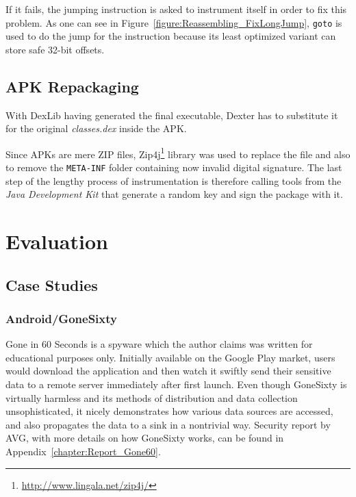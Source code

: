 \documentclass[12pt,twoside,notitlepage]{report}
\newcommand{\weblink}[1] {\footnote{\scriptsize\url{#1}}}
\begin{document}
If it fails, the jumping instruction is asked to instrument itself in order to fix this problem. As one can see in Figure~\ref{figure:Reassembling_FixLongJump}, \verb$goto$ is used to do the jump for the instruction because its least optimized variant can store safe 32-bit offsets.

\section{APK Repackaging}

With DexLib having generated the final executable, Dexter has to substitute it for the original \emph{classes.dex} inside the APK. 

Since APKs are mere ZIP files, Zip4j\weblink{http://www.lingala.net/zip4j/} library was used to replace the file and also to remove the \verb$META-INF$ folder containing now invalid digital signature. The last step of the lengthy process of instrumentation is therefore calling tools from the \emph{Java Development Kit} that generate a random key and sign the package with it.

\cleardoublepage
\chapter{Evaluation}

\section{Case Studies}

\subsection{Android/GoneSixty}

Gone in 60 Seconds is a spyware which the author claims was written for educational purposes only. Initially available on the Google Play market, users would download the application and then watch it swiftly send their sensitive data to a remote server immediately after first launch. Even though GoneSixty is virtually harmless and its methods of distribution and data collection unsophisticated, it nicely demonstrates how various data sources are accessed, and also propagates the data to a sink in a nontrivial way. Security report by AVG, with more details on how GoneSixty works, can be found in Appendix~\ref{chapter:Report_Gone60}.
\end{document}
